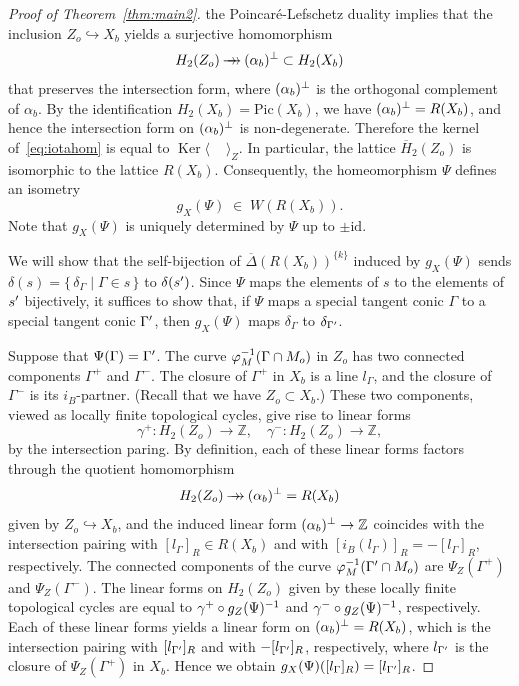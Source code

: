 \documentclass{math}
\theoremstyle{plain}
\numberwithin{equation}{section}
\newcommand{\ZZ}{\mathord{\mathbb Z}}
\newcommand{\inj}{\hookrightarrow}
\newcommand{\surj}{\mathbin{\to \hskip -7pt \to}}
\newcommand{\set}[2]{\{\,{#1}\mid {#2} \,\}}
\newcommand{\inv}{\sp{-1}}
\newcommand{\sprime}{\sp{\prime}}
\newcommand{\sperp}{\sp{\perp}}
\DeclareMathOperator{\Ker}{Ker}
\newcommand{\id}{\mathord{\mathrm{id}}}
\newcommand{\intf}[1]{\langle #1 \rangle}
\newcommand{\spset}[1]{^{\{#1\}}}
\newcommand{\Pic}{\mathrm{Pic}}
\newcommand{\barDelta}{\overline{\Delta}}
\newcommand{\barH}{\overline{H}}
\newcommand{\involB}{i_B}
\begin{document}
\begin{proof}[Proof of Theorem~\ref{thm:main2}]
the Poincar\'e-Lefschetz duality implies  that the inclusion $Z_o\inj X_b$ yields a surjective homomorphism
%
\begin{equation}\label{eq:iotahom}
H_2(Z_o)\surj (\alpha_b)\sperp \subset H_2(X_b)
\end{equation}
%
that preserves the intersection form,
where $(\alpha_b)\sperp$ is the orthogonal complement of $\alpha_b$. 
By the identification $H_2(X_b)=\Pic(X_b)$,
we have $(\alpha_b)\sperp=R(X_b)$, and 
hence  the intersection form on $(\alpha_b)\sperp$ is non-degenerate.
Therefore 
the kernel of~\eqref{eq:iotahom} is equal to $\Ker \intf{\phantom{i,i}}_Z$.
In particular, the lattice $\barH_2(Z_o)$ is  isomorphic to the lattice $R(X_b)$.
Consequently,  the homeomorphism $\Psi$ defines an isometry
\[
g_X(\Psi)\;\in\; W(R(X_b)).
\]
Note that $g_X(\Psi)$ is uniquely determined by $\Psi$  up to $\pm \id$.
%
%
\par
We will show that 
the self-bijection of $\barDelta(R(X_b))\spset{k}$ induced by 
 $g_X(\Psi)$ 
sends $\delta(s)=\set{\delta_{\Gamma}}{\Gamma\in s}$ to $\delta(s\sprime)$.
Since $\Psi$ maps the elements of $s$ to the elements of $s\sprime$ bijectively,
it suffices to show that,
if $\Psi$ maps a special tangent conic $\Gamma$ to a special tangent conic $\Gamma\sprime$,
then $g_X(\Psi)$ maps $\delta_{\Gamma}$ to $\delta_{\Gamma\sprime}$.
\par
Suppose that $\Psi(\Gamma)=\Gamma\sprime$.
The curve $\varphi_M\inv(\Gamma\cap M_o)$
in $Z_o$ has two connected components $\Gamma^+$ and $\Gamma^-$.
The closure of $\Gamma^+$ in $X_b$ is a line $l_{\Gamma}$,
and the closure of $\Gamma^-$ is its $\involB$-partner.
(Recall that we have $Z_o\subset X_b$.)
These two components, viewed as locally finite topological cycles, 
give rise to
linear forms
\[
\gamma^+\colon H_2(Z_o)\to \ZZ,
\quad 
\gamma^-\colon H_2(Z_o)\to \ZZ, 
\]
by the intersection paring.
By definition, 
each of  these linear forms  factors through the quotient homomorphism 
\[
H_2(Z_o)\surj (\alpha_b)\sperp= R(X_b)
\] 
given by $Z_o\inj X_b$,
and the induced  linear form $(\alpha_b)\sperp\to \ZZ$  coincides with  the intersection pairing with $[l_{\Gamma}]_R\in R(X_b)$
and  with $[\involB(l_{\Gamma})]_R=-[l_{\Gamma}]_R$, respectively.
The connected components of 
the curve $\varphi_M\inv(\Gamma\sprime \cap M_o)$ are
$\Psi_Z(\Gamma^{+})$ and $\Psi_Z(\Gamma^{-})$.
The linear forms
on $H_2(Z_o)$ given by these locally finite topological cycles
are equal to
$\gamma^{+}\circ g_Z(\Psi)\inv$ and $\gamma^{-}\circ g_Z(\Psi)\inv $, respectively.
Each of these linear forms yields
a linear form on $(\alpha_b)\sperp= R(X_b)$,
which is the intersection pairing  with $ [l_{\Gamma\sprime}]_R$ and with $-[l_{\Gamma\sprime}]_R$,
respectively, where $l_{\Gamma\sprime}$ is the closure of $\Psi_Z(\Gamma^{+})$ in $X_b$.
Hence we obtain $g_X(\Psi)( [l_{\Gamma}]_R)= [l_{\Gamma\sprime}]_R$.
\end{proof}
\end{document}
